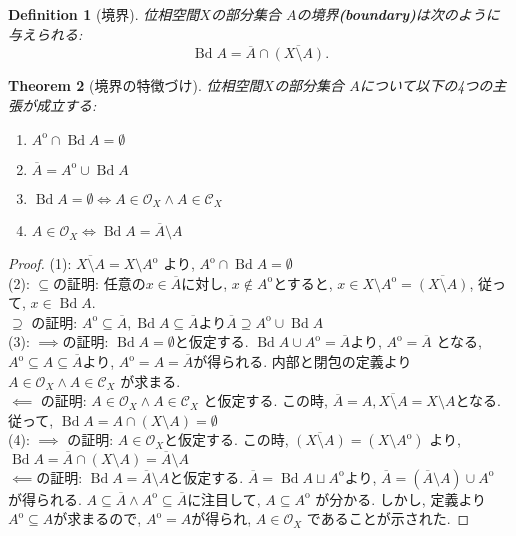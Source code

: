 \documentclass[lualatex]{ltjsbook}
\newcommand{\cl}[1]{\overline{ #1}  }
\newcommand{\Int}[1]{#1 ^{\mathrm{o}} }
\newcommand{\bd}[1]{\operatorname{Bd}{#1}}
\newtheorem{theorem}{Theorem}[chapter]
\newtheorem{definition}[theorem]{Definition}
\theoremstyle{remark}
\theoremstyle{plain}
\begin{document}
\begin{definition}[境界]
	位相空間$X$の部分集合 $A$の境界\textbf{(boundary)}は次のように与えられる:
	\[
	\bd{A}= \cl{A} \cap \cl{(X\setminus A)}
	.\] 
\end{definition}

\begin{theorem}[境界の特徴づけ]
	位相空間$X$の部分集合 $A$について以下の4つの主張が成立する: 
	 \begin{enumerate}
		\item $\Int{A} \cap \bd{A} = \emptyset$
		\item $\cl{A} = \Int{A} \cup \bd{A}$
		\item  $\bd{A} = \emptyset \iff A \in \mathcal{O}_X \land A \in \mathcal{C}_X$
	\item $A \in \mathcal{O}_X \iff \bd{A} = \cl{A} \setminus A $
	\end{enumerate}
\end{theorem}

\begin{proof}
	(1): $\cl{X\setminus A}= X\setminus \Int{ A }$ より,  $\Int{A} \cap \bd{A}= \emptyset$\\
	(2): $\subseteq$の証明: 任意の$x \in \cl{A}$に対し,   $x \not\in \Int{A}$とすると, $ x \in X \setminus \Int{A} = \cl{\left( X \setminus A \right) }$, 従って, $x \in \bd{A}.$\\
	$\supseteq$ の証明: $\Int{A} \subseteq \cl{A},  \bd{A} \subseteq \cl{A}$より$\cl{A} \supseteq \Int{A} \cup \bd{A}$ \\
	(3): $\implies$の証明: $\bd{A} = \emptyset$と仮定する. $\bd{A} \cup \Int{A} = \cl{A} $より,   $\Int{A} = \cl{A}$ となる,  $\Int{A} \subseteq A \subseteq \cl{A}$より,  $\Int{A} =A = \cl{A}$が得られる. 内部と閉包の定義より $A \in \mathcal{O}_X \land A \in \mathcal{C}_X$ が求まる.\\
	$\impliedby$ の証明: $A \in \mathcal{O}_X \land A \in \mathcal{C}_X$ と仮定する. この時,  $\cl{A} = A,  \cl{X\setminus A } = X \setminus A$となる.
	従って,  $\bd{A} = A \cap \left( X \setminus A \right) = \emptyset$ \\
	(4): $\implies$ の証明: $A \in \mathcal{O}_X $と仮定する. この時,  $\cl{\left( X \setminus A \right) } = \left( X \setminus \Int A \right)  $ より,  $\bd{A} = \cl{A} \cap \left( X \setminus A \right) = \cl{A} \setminus A$ \\
	$\impliedby$の証明: $\bd{A} = \cl{A} \setminus A$と仮定する. 
	$\cl{A} = \bd{A} \sqcup \Int{A}$より,  $\cl{A} = \left( \cl{A} \setminus A  \right) \cup \Int{A}$ が得られる. 
	$A \subseteq \cl{A} \land \Int{A} \subseteq \cl{A}$に注目して,   $ A \subseteq  \Int{A} $ が分かる. 
	しかし,  定義より$\Int{A} \subseteq A$が求まるので,   $\Int{A} = A$が得られ,   $A \in \mathcal{O}_X$ であることが示された.
	
\end{proof}
\end{document}
